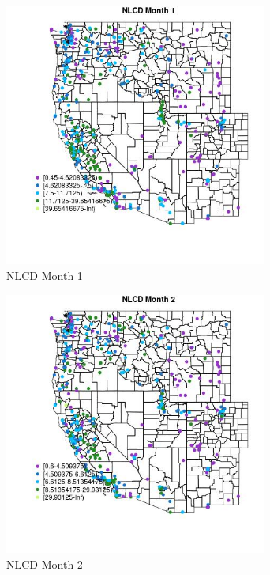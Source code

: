 \begin{figure} 
\centering  
\includegraphics[width=0.77\textwidth]{Code_Outputs/ML_input_report_ML_input_PM25_Step5_part_d_de_duplicated_aves_ML_input_MapObsMo1NLCD.jpg} 
\caption{\label{fig:ML_input_report_ML_input_PM25_Step5_part_d_de_duplicated_aves_ML_inputMapObsMo1NLCD}NLCD Month 1} 
\end{figure} 
 

\clearpage 

\begin{figure} 
\centering  
\includegraphics[width=0.77\textwidth]{Code_Outputs/ML_input_report_ML_input_PM25_Step5_part_d_de_duplicated_aves_ML_input_MapObsMo2NLCD.jpg} 
\caption{\label{fig:ML_input_report_ML_input_PM25_Step5_part_d_de_duplicated_aves_ML_inputMapObsMo2NLCD}NLCD Month 2} 
\end{figure} 
 

